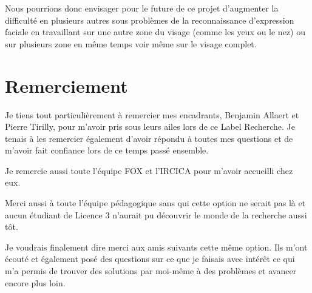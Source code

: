 \documentclass[12pt]{article}
\begin{document}
Nous pourrions donc envisager pour le future de ce projet d'augmenter la difficulté en plusieurs autres sous problèmes de la reconnaissance d'expression faciale en travaillant sur une autre zone du visage (comme les yeux ou le nez) ou sur plusieurs zone en même temps voir même sur le visage complet.

\pagebreak

\section*{Remerciement}

Je tiens tout particulièrement à remercier mes encadrants, Benjamin Allaert et Pierre Tirilly, pour m'avoir pris sous leurs ailes lors de ce Label Recherche. Je tenais à les remercier également d'avoir répondu à toutes mes questions et de m'avoir fait confiance lors de ce temps passé ensemble.

Je remercie aussi toute l'équipe FOX et l'IRCICA pour m'avoir accueilli chez eux.

Merci aussi à toute l'équipe pédagogique sans qui cette option ne serait pas là et aucun étudiant de Licence 3 n'aurait pu découvrir le monde de la recherche aussi tôt.

Je voudrais finalement dire merci aux amis suivants cette même option. Ils m'ont écouté et également posé des questions sur ce que je faisais avec intérêt ce qui m'a permis de trouver des solutions par moi-même à des problèmes et avancer encore plus loin.

\thispagestyle{empty}
\pagebreak

\appendix
\end{document}
